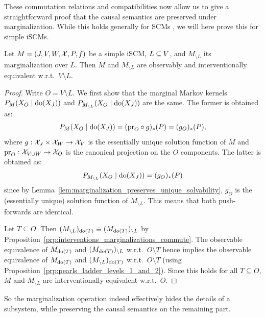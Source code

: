 These commutation relations and compatibilities now allow us to give a straightforward proof that
the causal semantics are preserved under marginalization.
While this holds generally for SCMs \cite{BFPM21}, we will here prove this for simple iSCMs.
\begin{Thm}\label{thm:various_equiv_marginalization}
  Let $M = \left ( J, V, W, \mathcal{X}, P, f \right )$ be a simple iSCM, $L \subseteq V$, and
  $M_{\setminus L}$ its marginalization over $L$. Then $M$ and $M_{\setminus L}$ are observably
  and interventionally equivalent w.r.t.\ $V \setminus L$.
\end{Thm}
\begin{proof}
  Write $O = V \setminus L$.
  We first show that the marginal Markov kernels $P_{M}(X_O \mid \operatorname{do}(X_J))$ and $P_{M_{\setminus L}}(X_O \mid \operatorname{do}(X_J))$ are the same.
  The former is obtained as:
  $$P_{M}(X_O \mid \operatorname{do}(X_J)) = (\mathrm{pr}_{O} \circ g)_*(P) = (g_{O})_*(P),$$
  where $g : \mathcal{X}_{J} \times \mathcal{X}_{W} \to \mathcal{X}_{V}$ is the essentially unique solution function of $M$ and
  $\mathrm{pr}_{O} : \mathcal{X}_{V \cup W} \to \mathcal{X}_{O}$ is the canonical projection on the $O$ components. 
  The latter is obtained as:
  $$P_{M_{\setminus L}}(X_O \mid \operatorname{do}(X_J)) = (g_O)_*(P)$$
  since by Lemma~\ref{lem:marginalization_preserves_unique_solvability}, $g_O$ is the (essentially unique) solution function of $M_{\setminus L}$.
  This means that both push-forwards are identical.

  Let $T \subseteq O$. Then $(M_{\setminus L})_{\operatorname{do}(T)} \equiv (M_{\operatorname{do}(T)})_{\setminus L}$ by
  Proposition~\ref{prp:interventions_marginalizations_commute}. 
  The observable equivalence of $M_{\operatorname{do}(T)}$ and $(M_{\operatorname{do}(T)})_{\setminus L}$ w.r.t.\ $O \setminus T$ hence implies the observable equivalence of $M_{\operatorname{do}(T)}$ and $(M_{\setminus L})_{\operatorname{do}(T)}$ w.r.t.\ $O \setminus T$ (using Proposition~\ref{prp:pearls_ladder_levels_1_and_2}).
  Since this holds for all $T \subseteq O$, $M$ and $M_{\setminus L}$ are interventionally equivalent w.r.t.\ $O$.
\end{proof}
So the marginalization operation indeed effectively hides the details of a subsystem, while preserving the causal semantics on the remaining part.

